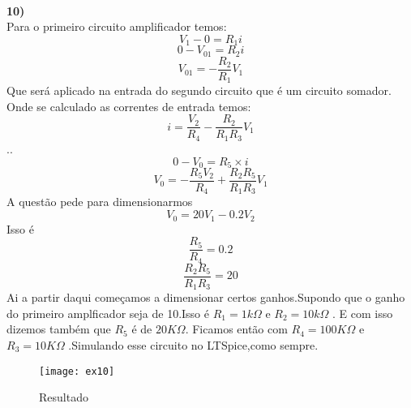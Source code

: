 \documentclass[11pt,a4paper]{article}
\begin{document}
\\
\newpage
\textbf{10) }
\\
Para o primeiro circuito amplificador temos:
$$V_1-0=R_1i$$
$$0-V_{01}=R_2i$$
$$V_{01}=-\frac{R_2}{R_1}V_1$$
Que será aplicado na entrada do segundo circuito que é um circuito somador.\\
Onde se calculado as correntes de entrada temos:
$$i =\frac{V_2}{R_4}-\frac{R_2}{R_1R_3}V_1$$
..
$$0-V_0=R_5\times i$$
$$V_0=-\frac{R_5V_2}{R_4}+\frac{R_2R_5}{R_1R_3}V_1$$
A questão pede para dimensionarmos 
$$V_0=20V_1 -0.2V_2$$
Isso é 
$$\frac{R_5}{R_4}=0.2$$
$$\frac{R_2R_5}{R_1R_3}=20$$
Ai a partir daqui começamos a dimensionar certos ganhos.Supondo que o ganho do primeiro amplficador seja de 10.Isso é $R_1=1k\Omega$ e $R_2=10k\Omega$ . E com isso dizemos também que $R_5$ é de $20K\Omega$. Ficamos então com $R_4=100 K\Omega$ e $R_3=10 K\Omega$ .Simulando esse circuito no LTSpice,como sempre.
\begin{figure}[!h]
\begin{center}
\texttt{[image: ex10]}
\caption{Resultado}
\end{center}
\end{figure}
\\
\end{document}
